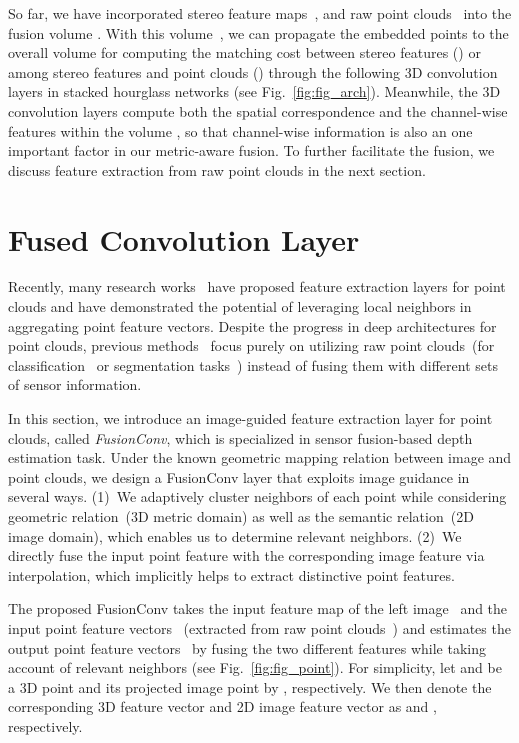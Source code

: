 \documentclass[letterpaper, 10 pt, conference]{ieeeconf}
\newcommand{\Fref}[1]{Fig.~\textcolor{blue}{\ref{#1}}}
\begin{document}
So far, we have incorporated stereo feature maps~,  and raw point clouds~ into the fusion volume . With this volume~, we can propagate the embedded points to the overall volume for computing the matching cost between stereo features () or among stereo features and point clouds () through the following 3D convolution layers in stacked hourglass networks (see \Fref{fig:fig_arch}). Meanwhile, the 3D convolution layers compute both the spatial correspondence and the channel-wise features within the volume , so that channel-wise information is also an one important factor in our metric-aware fusion. To further facilitate the fusion, we discuss feature extraction from raw point clouds  in the next section.


\section{Fused Convolution Layer}
\label{sec:Fused Convolution Layer}

Recently, many research works~\cite{pointnet,continuous_conv,point_conv,dynamic_graph_conv,interp_conv} have proposed feature extraction layers for point clouds and have demonstrated the potential of leveraging local neighbors in aggregating point feature vectors. Despite the progress in deep architectures for point clouds, previous methods~\cite{pointnet,continuous_conv,point_conv,dynamic_graph_conv,interp_conv} focus purely on utilizing raw point clouds~(for classification~\cite{dataset-pointclouds-shape-classification} or segmentation tasks~\cite{dataset-pointclouds-indoor-scene-segmentation,dataset-pointclouds-shape-segmentation}) instead of fusing them with different sets of sensor information. 

In this section, we introduce an image-guided feature extraction layer for point clouds, called \emph{FusionConv}, which is specialized in sensor fusion-based depth estimation task. Under the known geometric mapping relation between image and point clouds, we design a FusionConv layer that exploits image guidance in several ways. (1)~We adaptively cluster neighbors of each point while considering geometric relation~(3D metric domain) as well as the semantic relation~(2D image domain), which enables us to determine relevant neighbors. (2)~We directly fuse the input point feature with the corresponding image feature via interpolation, which implicitly helps to extract distinctive point features. 


The proposed FusionConv takes the input feature map of the left image~ and the input point feature vectors~ (extracted from raw point clouds~) and estimates the output point feature vectors~ by fusing the two different features while taking account of relevant neighbors (see \Fref{fig:fig_point}). For simplicity, let  and  be a 3D point and its projected image point by , respectively. We then denote the corresponding 3D feature vector and 2D image feature vector as  and , respectively.
\end{document}
